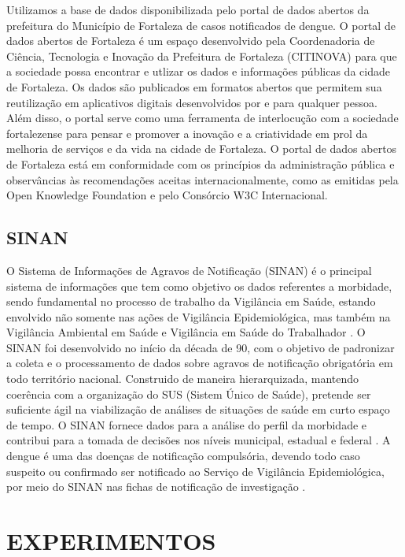 \documentclass[
	12pt,				%
	openright,			%
	oneside,	
	a4paper,				%
	english,				%
	brazil				%
]{abntex2/abntex2} %
\begin{document}
	Utilizamos a base de dados disponibilizada pelo portal de dados abertos da prefeitura do Município de Fortaleza de casos notificados de dengue. O portal de dados abertos de Fortaleza é um espaço desenvolvido pela Coordenadoria de Ciência, Tecnologia e Inovação da Prefeitura de Fortaleza (CITINOVA) para que a sociedade possa encontrar e utlizar os dados e informações públicas da cidade de Fortaleza. Os dados são publicados em formatos abertos que permitem sua reutilização em aplicativos digitais desenvolvidos por e para qualquer pessoa. Além disso, o portal serve como uma ferramenta de interlocução com a sociedade fortalezense para pensar e promover  a inovação e a criatividade em prol da melhoria de serviços e da vida na cidade de Fortaleza. O portal de dados abertos de Fortaleza está em conformidade com os princípios da administração pública e observâncias às recomendações aceitas internacionalmente, como as emitidas pela Open Knowledge Foundation e pelo Consórcio W3C Internacional.
		
		
	\section{SINAN}
	
	O Sistema de Informações de Agravos de Notificação (SINAN) é o principal sistema de informações que tem como objetivo os dados referentes a morbidade, sendo fundamental no processo de trabalho da Vigilância em Saúde, estando envolvido não somente nas ações de Vigilância Epidemiológica, mas também na Vigilância Ambiental em Saúde e Vigilância em Saúde do Trabalhador \cite{conass:2015}.
	O SINAN foi desenvolvido no início da década de 90, com o objetivo de padronizar a coleta e o processamento de dados sobre agravos de notificação obrigatória em todo território nacional. Construido de maneira hierarquizada, mantendo coerência com a organização do SUS (Sistem Único de Saúde), pretende ser suficiente ágil na viabilização de análises de situações de saúde em curto espaço de tempo. O SINAN fornece dados para a análise do perfil da morbidade e contribui para a tomada de decisões nos níveis municipal, estadual e federal \cite{saude:2008}.
	A dengue é uma das doenças de notificação compulsória, devendo todo caso suspeito ou confirmado ser notificado ao Serviço de Vigilância Epidemiológica, por meio do SINAN nas fichas de notificação de investigação \cite{saude:2008}.
	
	
\chapter{EXPERIMENTOS}
\end{document}
